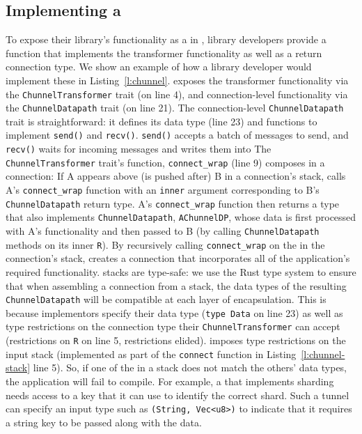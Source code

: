 \subsection{Implementing a \tunnel} 
\begin{outline}
\0 
\1 To expose their library's functionality as a \tunnel in \name, library developers provide a function that implements the transformer functionality as well as a return connection type.
  \2 We show an example of how a library developer would implement these in  Listing~\ref{l:chunnel}.
  \2 \name exposes the transformer functionality via the \texttt{ChunnelTransformer} trait (on line 4), and connection-level functionality via the \texttt{ChunnelDatapath} trait (on line 21).
  \2 The connection-level \texttt{ChunnelDatapath} trait is straightforward: it defines its data type (line 23) and functions to implement \texttt{send()} and \texttt{recv()}. \texttt{send()} accepts a batch of messages to send, and \texttt{recv()} waits for incoming messages and writes them into  
  \2 The \texttt{ChunnelTransformer} trait's function, \texttt{connect\_wrap} (line 9) composes \tunnels in a connection: 
    \3 If \tunnel A appears above (\ie is pushed after) \tunnel B in a connection's stack, \name calls \tunnel A's \texttt{connect\_wrap} function with an \texttt{inner} argument corresponding to \tunnel B's \texttt{ChunnelDatapath} return type. 
    \tunnel A's \texttt{connect\_wrap} function then returns a type that also implements \texttt{ChunnelDatapath}, \texttt{AChunnelDP}, whose data is first processed with \tunnel A's functionality and then passed to \tunnel B (by calling \texttt{ChunnelDatapath} methods on its inner \texttt{R}). 
    \3 By recursively calling \texttt{connect\_wrap} on the \tunnels in the connection's \tunnel stack, \name creates a connection that incorporates all of the application's required functionality.
\0 
\1 \tunnel stacks are type-safe: we use the Rust type system to ensure that when assembling a connection from a \tunnel stack, the data types of the resulting \texttt{ChunnelDatapath} will be compatible at each layer of encapsulation.
  \2 This is because \tunnel implementors specify their data type (\texttt{type Data} on line 23) as well as type restrictions on the connection type their \texttt{ChunnelTransformer} can accept (restrictions on \texttt{R} on line 5, restrictions elided).
  \2 \name imposes type restrictions on the input \tunnel stack (implemented as part of the \texttt{connect} function in Listing~\ref{l:chunnel-stack} line 5). So, if one of the \tunnels in a \tunnel stack does not match the others' data types, the application will fail to compile.
  \2 For example, a \tunnel that implements sharding needs access to a key that it can use to identify the correct shard. Such a tunnel can specify an input type such as \texttt{(String, Vec<u8>)} to indicate that it requires a string key to be passed along with the data. 
\end{outline}

